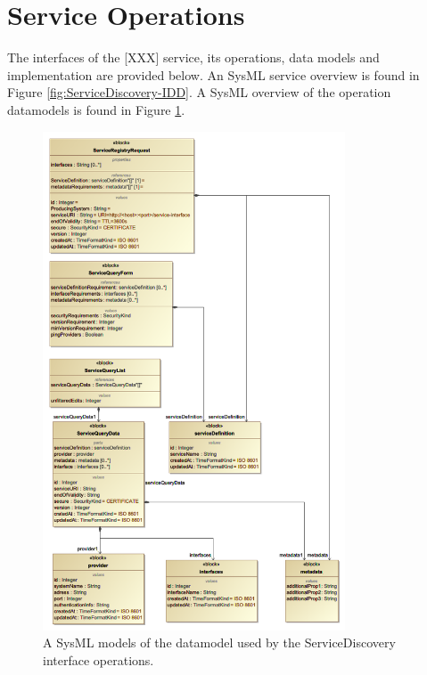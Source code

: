 \documentclass[a4paper]{arrowhead}
\begin{document}
\section{Service Operations}
\label{sec:functions}

The interfaces of the [XXX] service, its operations, data models and
implementation are provided below. An SysML service overview is found in Figure \ref{fig:ServiceDiscovery-IDD}. A SysML overview of the operation datamodels is found in Figure \ref{fig:ServiceDiscovery-datamodels}.

\begin{figure}[ht!]
  \centering
  \includegraphics[width=0.8\textwidth]{figures/ServiceDiscovery-datamodels}
  \caption{A SysML models of the datamodel used by the
    ServiceDiscovery interface operations. }
  \label{fig:ServiceDiscovery-datamodels}
\end{figure}
\end{document}
